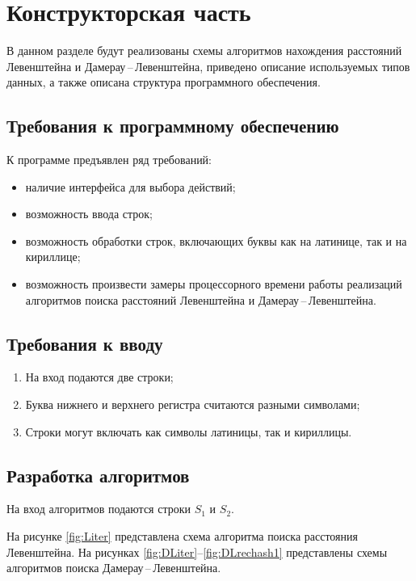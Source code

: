 \chapter{Конструкторская часть}

В данном разделе будут реализованы схемы алгоритмов нахождения расстояний Левенштейна и Дамерау\,--\,Левенштейна, приведено описание используемых типов данных, а также описана структура программного обеспечения.

\section{Требования к программному обеспечению}\label{section:requirements}
К программе предъявлен ряд требований:
\begin{itemize}[label=---]
	\item наличие интерфейса для выбора действий;
	\item возможность ввода строк;
	\item возможность обработки строк, включающих буквы как на латинице, так и на кириллице;
	\item возможность произвести замеры процессорного времени работы реализаций алгоритмов поиска расстояний Левенштейна и Дамерау\,--\,Левенштейна.
\end{itemize}

\section{Требования к вводу}\label{section:requirements}
\begin{enumerate}
    \item На вход подаются две строки;
    \item Буква нижнего и верхнего регистра считаются разными символами;
    \item Строки могут включать как символы латиницы, так и кириллицы.
\end{enumerate}

\section{Разработка алгоритмов}

На вход алгоритмов подаются строки $S_1$ и $S_2$.

На рисунке \ref{fig:Liter} представлена схема алгоритма поиска расстояния Левенштейна.
На рисунках \ref{fig:DLiter}--\ref{fig:DLrechash1} представлены схемы алгоритмов поиска Дамерау\,--\,Левенштейна.

